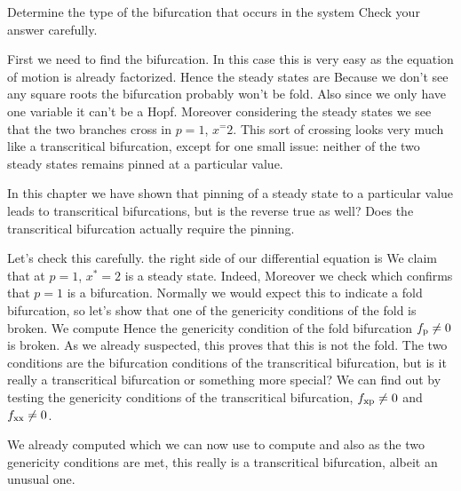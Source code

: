 
Determine the type of the bifurcation that occurs in the system
Check your answer carefully.

\solution 
First we need to find the bifurcation. In this case this is very easy as the equation of motion is already factorized. Hence the steady states are 
Because we don't see any square roots the bifurcation probably won't be fold. Also since we only have one variable it can't be a Hopf. Moreover considering the steady states we see that the two branches cross in $p=1$, $x^=2$. This sort of crossing looks very much like a transcritical bifurcation, except for one small issue: neither of the two steady states remains pinned at a particular value. 

In this chapter we have shown that pinning of a steady state to a particular value leads to transcritical bifurcations, but is the reverse true as well? Does the transcritical bifurcation actually require the pinning. 

Let's check this carefully. the right side of our differential equation is 
We claim that at $p=1$, $x^*=2$ is a steady state. Indeed, 
Moreover we check
which confirms that $p=1$ is a bifurcation. Normally we would expect this to indicate a fold bifurcation, so let's show that one of the genericity conditions of the fold is broken. We compute
Hence the genericity condition of the fold bifurcation $f_{\rm p}\neq 0$ is broken. As we already suspected, this proves that this is not the fold. The two conditions 
are the bifurcation conditions of the transcritical bifurcation, but is it really a transcritical bifurcation or something more special? We can find out by testing the genericity conditions of the transcritical bifurcation, $f_{\rm xp}\neq 0$ and $f_{\rm xx}\neq 0$. 

We already computed 
which we can now use to compute 
and also 
as the two genericity conditions are met, this really is a transcritical bifurcation, albeit an unusual one. 
